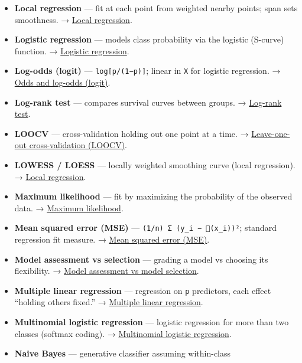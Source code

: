 \documentclass[
  10pt,
  letterpaper,
  onecolumn]{article}
\begin{document}
\begin{itemize}
  classifier, shared covariance → linear boundary. →
  \protect\hyperlink{linear-discriminant-analysis-lda}{Linear
  discriminant analysis (LDA)}.
\item
  \textbf{Local regression} --- fit at each point from weighted nearby
  points; span sets smoothness. →
  \protect\hyperlink{local-regression}{Local regression}.
\item
  \textbf{Logistic regression} --- models class probability via the
  logistic (S-curve) function. →
  \protect\hyperlink{logistic-regression}{Logistic regression}.
\item
  \textbf{Log-odds (logit)} --- \texttt{log{[}p/(1−p){]}}; linear in
  \texttt{X} for logistic regression. →
  \protect\hyperlink{odds-and-log-odds-logit}{Odds and log-odds
  (logit)}.
\item
  \textbf{Log-rank test} --- compares survival curves between groups. →
  \protect\hyperlink{log-rank-test}{Log-rank test}.
\item
  \textbf{LOOCV} --- cross-validation holding out one point at a time. →
  \protect\hyperlink{leave-one-out-cross-validation-loocv}{Leave-one-out
  cross-validation (LOOCV)}.
\item
  \textbf{LOWESS / LOESS} --- locally weighted smoothing curve (local
  regression). → \protect\hyperlink{local-regression}{Local regression}.
\item
  \textbf{Maximum likelihood} --- fit by maximizing the probability of
  the observed data. → \protect\hyperlink{maximum-likelihood}{Maximum
  likelihood}.
\item
  \textbf{Mean squared error (MSE)} ---
  \texttt{(1/n)\ Σ\ (y\_i\ −\ (x\_i))²}; standard regression fit
  measure. → \protect\hyperlink{mean-squared-error-mse}{Mean squared
  error (MSE)}.
\item
  \textbf{Model assessment vs selection} --- grading a model vs choosing
  its flexibility. →
  \protect\hyperlink{model-assessment-vs-model-selection}{Model
  assessment vs model selection}.
\item
  \textbf{Multiple linear regression} --- regression on \texttt{p}
  predictors, each effect ``holding others fixed.'' →
  \protect\hyperlink{multiple-linear-regression}{Multiple linear
  regression}.
\item
  \textbf{Multinomial logistic regression} --- logistic regression for
  more than two classes (softmax coding). →
  \protect\hyperlink{multinomial-logistic-regression}{Multinomial
  logistic regression}.
\item
  \textbf{Naive Bayes} --- generative classifier assuming within-class

\end{itemize}
\end{document}
